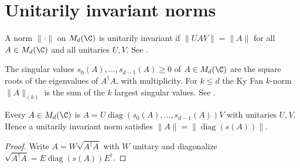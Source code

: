 
\section{Unitarily invariant norms}

\begin{definition}
    \label{def:unitarily_invariant_norm}
    \leanok
    A norm $\|\cdot\|$ on $M_d(\C)$ is unitarily invariant if
    $\|UAV\|=\|A\|$ for all $A\in M_d(\C)$ and all unitaries $U,V$.
    See \cite[Section~8.1]{Wolf2012Quantum}.
\end{definition}

\begin{definition}
    \label{def:singular_value_ky_fan_norm}
    \leanok
    The singular values $s_0(A),\ldots,s_{d-1}(A)\ge0$ of $A\in M_d(\C)$ are the
    square roots of the eigenvalues of $A^\dagger A$, with multiplicity. For
    $k\le d$ the Ky Fan $k$-norm $\|A\|_{(k)}$ is the sum of the $k$ largest
    singular values. See \cite[Section~8.1]{Wolf2012Quantum}.
\end{definition}

\begin{lemma}
    \label{lem:singular_value_decomposition_diagonal}
    \leanok
    Every $A\in M_d(\C)$ is $A=U\operatorname{diag}(s_0(A),\ldots,s_{d-1}(A))V$
    with unitaries $U,V$. Hence a unitarily invariant norm satisfies
    $\|A\|=\|\operatorname{diag}(s(A))\|$.
\end{lemma}
\begin{proof}\leanok
    Write $A=W\sqrt{A^\dagger A}$ with $W$ unitary and diagonalize
    $\sqrt{A^\dagger A}=E\operatorname{diag}(s(A))E^\dagger$.
\end{proof}

